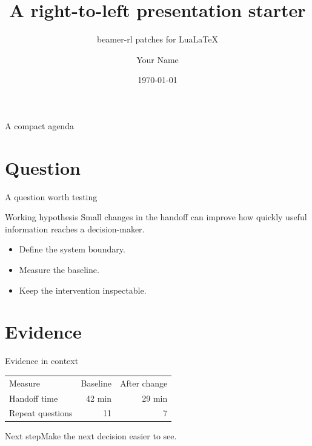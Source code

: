\documentclass{beamer-rl}
\title{A right-to-left presentation starter}
\subtitle{beamer-rl patches for LuaLaTeX}
\author{Your Name}
\institute{Your Organisation}
\date{\today}
\begin{document}
\begin{frame}\titlepage\end{frame}
\begin{frame}{A compact agenda}\tableofcontents\end{frame}
\section{Question}
\begin{frame}{A question worth testing}
  \begin{block}{Working hypothesis}
    Small changes in the handoff can improve how quickly useful information reaches a decision-maker.
  \end{block}
  \begin{itemize}
    \item Define the system boundary.
    \item Measure the baseline.
    \item Keep the intervention inspectable.
  \end{itemize}
\end{frame}
\section{Evidence}
\begin{frame}{Evidence in context}
  \begin{tabular}{lrr}
    Measure & Baseline & After change\\
    Handoff time & 42 min & 29 min\\
    Repeat questions & 11 & 7\\
  \end{tabular}
\end{frame}
\begin{frame}{Next step}\centering\Large Make the next decision easier to see.\end{frame}
\end{document}
